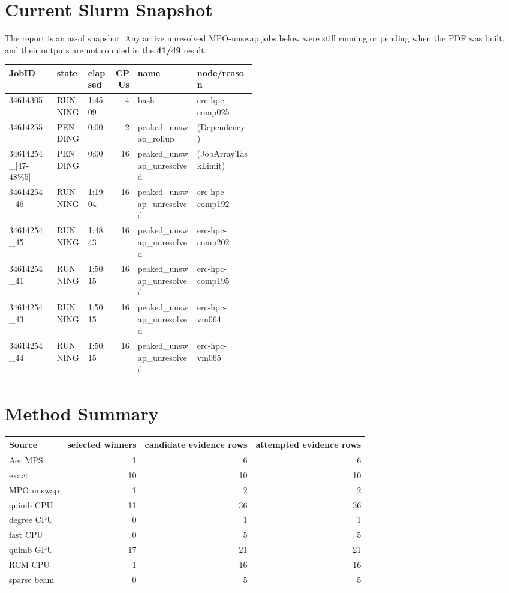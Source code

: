 \documentclass[10pt]{article}
\begin{document}
\section*{Current Slurm Snapshot}
The report is an as-of snapshot. Any active unresolved MPO-unswap jobs below were still running or pending when the PDF was built,
and their outputs are not counted in the \textbf{41/49} result.

\begin{longtable}{l l l r p{0.24\linewidth} p{0.24\linewidth}}
\toprule
JobID & state & elapsed & CPUs & name & node/reason \\
\midrule
34614305 & RUNNING & 1:45:09 & 4 & bash & erc-hpc-comp025 \\
34614255 & PENDING & 0:00 & 2 & peaked\_unswap\_rollup & (Dependency) \\
34614254\_[47-48\%5] & PENDING & 0:00 & 16 & peaked\_unswap\_unresolved & (JobArrayTaskLimit) \\
34614254\_46 & RUNNING & 1:19:04 & 16 & peaked\_unswap\_unresolved & erc-hpc-comp192 \\
34614254\_45 & RUNNING & 1:48:43 & 16 & peaked\_unswap\_unresolved & erc-hpc-comp202 \\
34614254\_41 & RUNNING & 1:50:15 & 16 & peaked\_unswap\_unresolved & erc-hpc-comp195 \\
34614254\_43 & RUNNING & 1:50:15 & 16 & peaked\_unswap\_unresolved & erc-hpc-vm064 \\
34614254\_44 & RUNNING & 1:50:15 & 16 & peaked\_unswap\_unresolved & erc-hpc-vm065 \\
\bottomrule
\end{longtable}

\section*{Method Summary}
\begin{longtable}{l r r r}
\toprule
Source & selected winners & candidate evidence rows & attempted evidence rows \\
\midrule
Aer MPS & 1 & 6 & 6 \\
exact & 10 & 10 & 10 \\
MPO unswap & 1 & 2 & 2 \\
quimb CPU & 11 & 36 & 36 \\
degree CPU & 0 & 1 & 1 \\
fast CPU & 0 & 5 & 5 \\
quimb GPU & 17 & 21 & 21 \\
RCM CPU & 1 & 16 & 16 \\
sparse beam & 0 & 5 & 5 \\
\bottomrule
\end{longtable}
\end{document}
